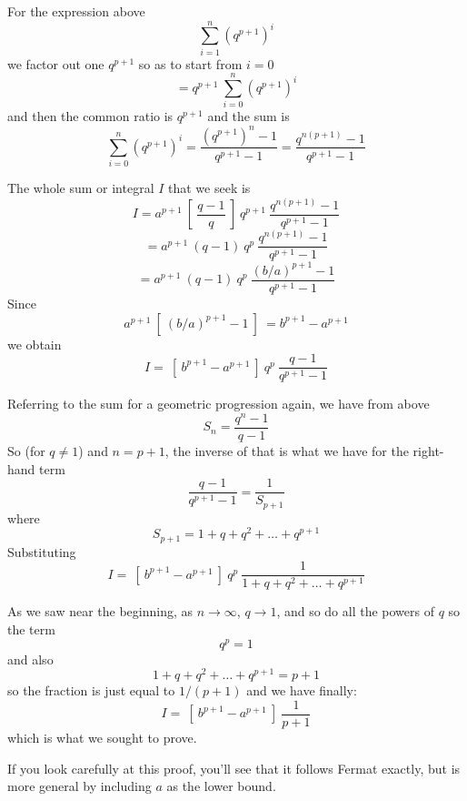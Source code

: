 \documentclass[11pt, oneside]{article}   	%
\begin{document}
For the expression above
\[  \sum_{i=1}^n  (q^{p+1})^i  \]
we factor out one $q^{p+1}$ so as to start from $i=0$
\[ = q^{p+1} \ \sum_{i=0}^n  (q^{p+1})^i  \]
and then the common ratio is $q^{p+1}$ and the sum is
\[ \sum_{i=0}^n  (q^{p+1})^i = \frac{(q^{p+1})^{n} - 1}{q^{p+1} - 1} = \frac{q^{n(p+1)} - 1}{q^{p+1} - 1} \]

The whole sum or integral $I$ that we seek is
\[ I = a^{p+1} \  [ \ \frac{q-1}{q} \ ] \  q^{p+1} \ \frac{q^{n(p+1)} - 1}{q^{p+1} - 1} \]
\[ = a^{p+1} \ (q-1) \ q^p  \ \frac{q^{n(p+1)} - 1}{q^{p+1} - 1} \]
\[ = a^{p+1} \  (q-1) \ q^p  \ \frac{(b/a)^{p+1} - 1}{q^{p+1} - 1} \]
Since
\[ a^{p+1} \ [ \ (b/a)^{p+1} - 1 \ ] \ = b^{p+1} - a^{p+1} \]
we obtain
\[ I = \ [ \ b^{p+1} - a^{p+1} \ ] \ q^p \ \frac{q-1}{q^{p+1} - 1} \]

Referring to the sum for a geometric progression again, we have from above 
\[ S_n = \frac{q^n - 1}{q - 1}  \]
So (for $q \ne 1$) and $n=p+1$, the inverse of that is what we have for the right-hand term
\[ \frac{q-1}{q^{p+1} - 1} = \frac{1}{S_{p+1} }  \]
where
\[ S_{p+1} = 1 + q + q^2 + \dots + q^{p+1} \]
Substituting
\[ I = \ [ \ b^{p+1} - a^{p+1} \ ] \ q^p \ \frac{1}{1 + q + q^2 + \dots + q^{p+1}}  \]

As we saw near the beginning, as $n \rightarrow \infty$, $q \rightarrow 1$, and so do all the powers of $q$ so the term
\[ q^p = 1 \]
and also
\[ 1 + q + q^2 + \dots + q^{p+1} = p + 1 \]
so the fraction is just equal to $1/(p+1)$ and we have finally:
\[ I = \ [ \ b^{p+1} - a^{p+1} \ ] \ \frac{1}{p + 1} \]
which is what we sought to prove.

If you look carefully at this proof, you'll see that it follows Fermat exactly, but is more general by including $a$ as the lower bound.
\end{document}
